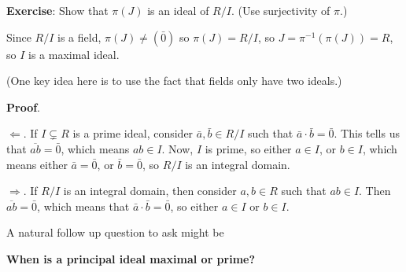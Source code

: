 \documentclass[12pt]{article}
\begin{document}
{\bf Exercise}: Show that $\pi(J)$ is an ideal of $R / I$. (Use surjectivity of
$\pi$.)

Since $R / I$ is a field, $\pi(J) \ne (\bar 0)$ so $\pi(J) = R / I$, so $J =
\pi^{-1}(\pi(J)) = R$, so $I$ is a maximal ideal.

(One key idea here is to use the fact that fields only have two ideals.)





{\bf Proof}.

$\Leftarrow$. If $I \subsetneq R$ is a prime ideal, consider $\bar a, \bar b \in
R / I$ such that $\bar a \cdot \bar b = \bar 0$. This tells us that
$\overline{ab} = \bar 0$, which means $ab \in I$. Now, $I$ is prime, so either
$a \in I$, or $b \in I$, which means either $\bar a = \bar 0$, or $\bar b = \bar
0$, so $R / I$ is an integral domain.

$\Rightarrow$. If $R / I$ is an integral domain, then consider $a, b \in R$ such
that $ab \in I$. Then $\overline{ab} = \bar 0$, which means that $\bar a \cdot
\bar b = \bar 0$, so either $a \in I$ or $b \in I$.

A natural follow up question to ask might be

{\bf When is a principal ideal maximal or prime?}
\end{document}
